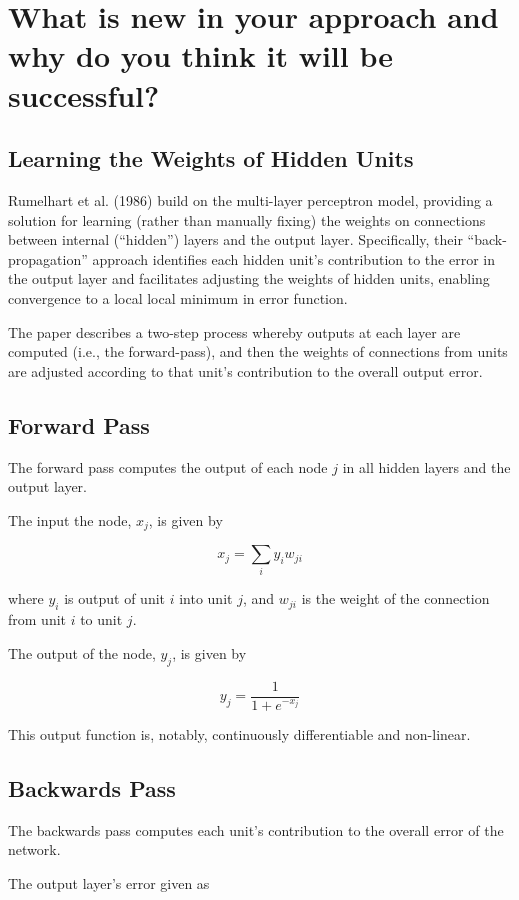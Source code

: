 \documentclass[10pt]{article}
\begin{document}
\section*{What is new in your approach and why do you think it will be successful?}

\subsection*{Learning the Weights of Hidden Units}
Rumelhart et al. (1986) build on the multi-layer perceptron model, providing a solution for learning (rather than manually fixing) the weights on connections between internal (``hidden'') layers and the output layer. Specifically, their ``back-propagation'' approach identifies each hidden unit's contribution to the error in the output layer and facilitates adjusting the weights of hidden units, enabling convergence to a local local minimum in error function.

The paper describes a two-step process whereby outputs at each layer are computed (i.e., the forward-pass), and then the weights of connections from units are adjusted according to that unit's contribution to the overall output error.

\subsection*{Forward Pass}
The forward pass computes the output of each node $j$ in all hidden layers and the output layer.

The input the node, $x_j$, is given by

$$ x_j = \sum_{i}y_{i}w_{ji} $$

where $y_i$ is output of unit $i$ into unit $j$, and $w_{ji}$ is the weight of the connection from unit $i$ to unit $j$.

The output of the node, $y_j$, is given by

$$ y_j = \frac{1}{1 + e^{-x_j}} $$

This output function is, notably, continuously differentiable and non-linear.

\subsection*{Backwards Pass}

The backwards pass computes each unit's contribution to the overall error of the network.

The output layer's error given as
\end{document}
